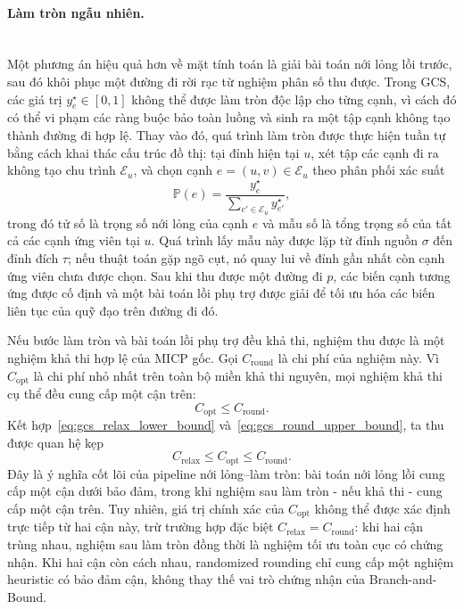 \paragraph{Làm tròn ngẫu nhiên.}\mbox{}\\

Một phương án hiệu quả hơn về mặt tính toán là giải bài toán nới lỏng lồi trước, sau đó khôi phục một đường đi rời rạc từ nghiệm phân số thu được.
Trong GCS, các giá trị $y_e^\star \in [0,1]$ không thể được làm tròn độc lập cho từng cạnh, vì cách đó có thể vi phạm các ràng buộc bảo toàn luồng và sinh ra một tập cạnh không tạo thành đường đi hợp lệ.
Thay vào đó, quá trình làm tròn được thực hiện tuần tự bằng cách khai thác cấu trúc đồ thị: tại đỉnh hiện tại $u$, xét tập các cạnh đi ra không tạo chu trình $\mathcal{E}_u$, và chọn cạnh $e = (u,v) \in \mathcal{E}_u$ theo phân phối xác suất
\begin{equation}
    \mathbb{P}(e)
    =
    \frac{y_e^\star}{\displaystyle\sum_{e' \in \mathcal{E}_u} y_{e'}^\star},
    \label{eq:gcs_randomized_rounding_prob}
\end{equation}
trong đó tử số là trọng số nới lỏng của cạnh $e$ và mẫu số là tổng trọng số của tất cả các cạnh ứng viên tại $u$.
Quá trình lấy mẫu này được lặp từ đỉnh nguồn $\sigma$ đến đỉnh đích $\tau$; nếu thuật toán gặp ngõ cụt, nó quay lui về đỉnh gần nhất còn cạnh ứng viên chưa được chọn.
Sau khi thu được một đường đi $p$, các biến cạnh tương ứng được cố định và một bài toán lồi phụ trợ được giải để tối ưu hóa các biến liên tục của quỹ đạo trên đường đi đó.

Nếu bước làm tròn và bài toán lồi phụ trợ đều khả thi, nghiệm thu được là một nghiệm khả thi hợp lệ của MICP gốc.
Gọi $C_{\mathrm{round}}$ là chi phí của nghiệm này.
Vì $C_{\mathrm{opt}}$ là chi phí nhỏ nhất trên toàn bộ miền khả thi nguyên, mọi nghiệm khả thi cụ thể đều cung cấp một cận trên:
\begin{equation}
    C_{\mathrm{opt}} \le C_{\mathrm{round}}.
    \label{eq:gcs_round_upper_bound}
\end{equation}
Kết hợp~\eqref{eq:gcs_relax_lower_bound} và~\eqref{eq:gcs_round_upper_bound}, ta thu được quan hệ kẹp
\begin{equation}
    C_{\mathrm{relax}}
    \le
    C_{\mathrm{opt}}
    \le
    C_{\mathrm{round}}.
    \label{eq:gcs_sandwich_bound}
\end{equation}
Đây là ý nghĩa cốt lõi của pipeline nới lỏng--làm tròn: bài toán nới lỏng lồi cung cấp một cận dưới bảo đảm, trong khi nghiệm sau làm tròn - nếu khả thi - cung cấp một cận trên.
Tuy nhiên, giá trị chính xác của $C_{\mathrm{opt}}$ không thể được xác định trực tiếp từ hai cận này, trừ trường hợp đặc biệt $C_{\mathrm{relax}} = C_{\mathrm{round}}$: khi hai cận trùng nhau, nghiệm sau làm tròn đồng thời là nghiệm tối ưu toàn cục có chứng nhận.
Khi hai cận còn cách nhau, randomized rounding chỉ cung cấp một nghiệm heuristic có bảo đảm cận, không thay thế vai trò chứng nhận của Branch-and-Bound.

